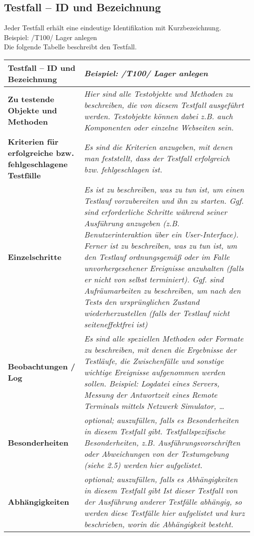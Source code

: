 \subsection{Testfall -- ID und Bezeichnung}
Jeder Testfall erh\"alt eine eindeutige Identifikation mit Kurzbezeichnung.\\
Beispiel: /T100/ Lager anlegen\\
Die folgende Tabelle beschreibt den Testfall. \\
\begin{longtable}{|p{5cm}|p{10cm}|}
\hline
\textbf{Testfall -- ID und Bezeichnung} &  \textit{Beispiel:
                                                        /T100/ Lager anlegen} \\
\hline
\textbf{Zu testende Objekte und Methoden} &  \textit{Hier sind alle Testobjekte
und Methoden zu beschreiben, die von diesem Testfall ausgef\"uhrt werden.
Testobjekte k\"onnen dabei z.B. auch Komponenten oder einzelne Webseiten sein.}
\\
\hline
\textbf{Kriterien f\"ur erfolgreiche bzw. fehlgeschlagene Testf\"alle} &
\textit{Es sind die Kriterien anzugeben, mit denen man feststellt, dass der
Testfall erfolgreich bzw. fehlgeschlagen ist. } \\
\hline
\textbf{Einzelschritte} &  \textit{Es ist zu beschreiben, was zu tun ist, um
einen Testlauf vorzubereiten und ihn zu starten.
Ggf. sind erforderliche Schritte w\"ahrend seiner Ausf\"uhrung anzugeben (z.B.
Benutzerinteraktion \"uber ein User-Interface). Ferner ist zu beschreiben, was zu
tun ist, um den Testlauf ordnungsgem\"aß oder im Falle unvorhergesehener
Ereignisse anzuhalten (falls er nicht von selbst terminiert).
Ggf. sind Aufr\"aumarbeiten zu beschreiben, um nach den Tests den urspr\"unglichen
Zustand wiederherzustellen (falls der Testlauf nicht seiteneffektfrei ist)
} \\
\hline
\textbf{Beobachtungen / Log} &  \textit{Es sind alle speziellen Methoden oder
Formate zu beschreiben, mit denen die Ergebnisse der Testl\"aufe, die
Zwischenf\"alle und sonstige wichtige Ereignisse aufgenommen werden sollen.
Beispiel: Logdatei eines Servers, Messung der Antwortzeit eines Remote
Terminals mittels Netzwerk Simulator, \ldots} \\
\hline
\textbf{Besonderheiten } &  \textit{optional; auszuf\"ullen, falls es
Besonderheiten in diesem Testfall gibt.
Testfallspezifische Besonderheiten, z.B. Ausf\"uhrungsvorschriften oder
Abweichungen von der Testumgebung (siehe 2.5)  werden hier aufgelistet.} \\
\hline
\textbf{Abh\"angigkeiten} &  \textit{optional; auszuf\"ullen, falls es
Abh\"angigkeiten in diesem Testfall gibt
Ist dieser Testfall von der Ausf\"uhrung anderer Testf\"alle abh\"angig, so werden
diese Testf\"alle hier aufgelistet und kurz beschrieben, worin die Abh\"angigkeit
besteht.} \\
\hline

 \end{longtable}

